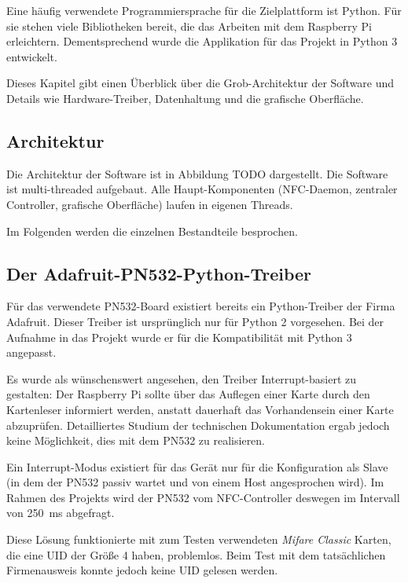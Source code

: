 \documentclass[11pt,a4paper]{IEEEtran} \usepackage[ngerman]{babel}
\begin{document}
Eine häufig verwendete Programmiersprache für die Zielplattform ist Python. Für
sie stehen viele Bibliotheken bereit, die das Arbeiten mit dem Raspberry Pi 
erleichtern. Dementsprechend wurde die Applikation für das Projekt in Python 3
entwickelt.

Dieses Kapitel gibt einen Überblick über die Grob-Architektur der Software und
Details wie Hardware-Treiber, Datenhaltung und die grafische Oberfläche.

\subsection{Architektur}

Die Architektur der Software ist in Abbildung TODO dargestellt. Die Software
ist multi-threaded aufgebaut. Alle Haupt-Komponenten (NFC-Daemon, zentraler 
Controller, grafische Oberfläche) laufen in eigenen Threads. 

Im Folgenden werden die einzelnen Bestandteile besprochen.

\subsection{Der Adafruit-PN532-Python-Treiber} 

Für das verwendete PN532-Board existiert bereits ein Python-Treiber der Firma
Adafruit\autocite{AdafruitPN532}. Dieser Treiber ist ursprünglich nur für Python
2 vorgesehen. Bei der Aufnahme in das Projekt wurde er für die Kompatibilität
mit Python 3 angepasst.

Es wurde als wünschenswert angesehen, den Treiber Interrupt-basiert zu
gestalten: Der Raspberry Pi sollte über das Auflegen einer Karte durch den
Kartenleser informiert werden, anstatt dauerhaft das Vorhandensein einer Karte
abzuprüfen. Detailliertes Studium der technischen
Dokumentation\autocite{Pn532Manual} ergab jedoch keine Möglichkeit, dies mit
dem PN532 zu realisieren. 

Ein Interrupt-Modus existiert für das Gerät nur für 
die Konfiguration als Slave (in dem der PN532 passiv wartet und von einem Host
angesprochen wird). Im Rahmen des Projekts wird der PN532 vom NFC-Controller
deswegen im Intervall von \SI{250}{\milli\second} abgefragt.

Diese Lösung funktionierte mit zum Testen verwendeten \emph{Mifare Classic}
Karten, die eine UID der Größe \SI{4}{\byte} haben, problemlos. Beim Test mit
dem tatsächlichen Firmenausweis konnte jedoch keine UID gelesen werden.
\end{document}
